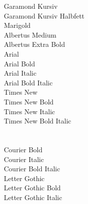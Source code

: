 \documentclass[12pt]{article}
\begin{document}
\noindent{} Garamond Kursiv\\
 Garamond Kursiv Halbfett\\
 Marigold\\
 Albertus Medium\\
 Albertus Extra Bold\\
 Arial\\
 Arial Bold\\
 Arial Italic\\
 Arial Bold Italic\\
 Times New\\
 Times New Bold\\
 Times New Italic\\
 Times New Bold Italic\\
 \\
\\
 Courier Bold\\
 Courier Italic\\
 Courier Bold Italic\\
 Letter Gothic\\
 Letter Gothic Bold\\
 Letter Gothic Italic\\
\end{document}
